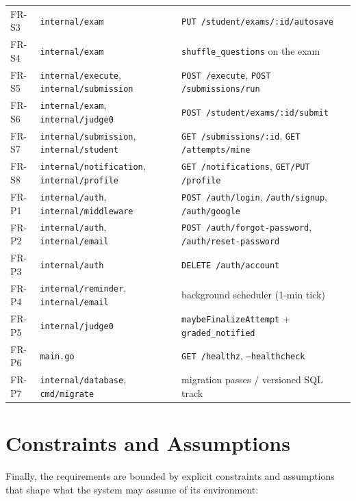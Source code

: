 \begin{table}[htbp]
\begin{tabularx}{\textwidth}{@{}L{1.4cm} L{4.2cm} X@{}}
FR-S3  & \texttt{internal/exam}         & \texttt{PUT /student/exams/:id/autosave} \\
FR-S4  & \texttt{internal/exam}         & \texttt{shuffle\_questions} on the exam \\
FR-S5  & \texttt{internal/execute}, \texttt{internal/submission} & \texttt{POST /execute}, \texttt{POST /submissions/run} \\
FR-S6  & \texttt{internal/exam}, \texttt{internal/judge0}      & \texttt{POST /student/exams/:id/submit} \\
FR-S7  & \texttt{internal/submission}, \texttt{internal/student} & \texttt{GET /submissions/:id}, \texttt{GET /attempts/mine} \\
FR-S8  & \texttt{internal/notification}, \texttt{internal/profile} & \texttt{GET /notifications}, \texttt{GET/PUT /profile} \\
\addlinespace
FR-P1  & \texttt{internal/auth}, \texttt{internal/middleware} & \texttt{POST /auth/login}, \texttt{/auth/signup}, \texttt{/auth/google} \\
FR-P2  & \texttt{internal/auth}, \texttt{internal/email}      & \texttt{POST /auth/forgot-password}, \texttt{/auth/reset-password} \\
FR-P3  & \texttt{internal/auth}         & \texttt{DELETE /auth/account} \\
FR-P4  & \texttt{internal/reminder}, \texttt{internal/email}  & background scheduler (1-min tick) \\
FR-P5  & \texttt{internal/judge0}       & \texttt{maybeFinalizeAttempt} + \texttt{graded\_notified} \\
FR-P6  & \texttt{main.go}               & \texttt{GET /healthz}, \texttt{--healthcheck} \\
FR-P7  & \texttt{internal/database}, \texttt{cmd/migrate}     & migration passes / versioned SQL track \\
\bottomrule
\end{tabularx}
\end{table}

\section{Constraints and Assumptions}
\label{sec:req-constraints}

Finally, the requirements are bounded by explicit constraints and assumptions that shape
what the system may assume of its environment:

